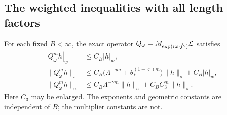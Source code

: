 \subsection{The weighted inequalities with all length factors}
\begin{proposition}
\label{prop:v35-expanded-LY}
For each fixed $B<\infty$, the exact operator
$Q_\omega=M_{\exp(i\omega\cdot\check f^{\rm c})}\mathcal L$ satisfies
\begin{align}
 |Q_\omega^m h|_w&\le C_B|h|_w,                  \label{eq:v35-LY-w}\\
 \|Q_\omega^m h\|_s
 &\le C_B\bigl(\Lambda^{-qm}
             +\theta_*^{(1-\varsigma)m}\bigr)\|h\|_s+C_B|h|_w,
                                                       \label{eq:v35-LY-s}\\
 \|Q_\omega^m h\|_u
 &\le C_B\Lambda^{-\gamma m}\|h\|_u+C_BC_3^m\|h\|_s.
                                                       \label{eq:v35-LY-u}
\end{align}
Here $C_3$ may be enlarged. The exponents and geometric constants are
independent of $B$; the multiplier constants are not.
\end{proposition}
